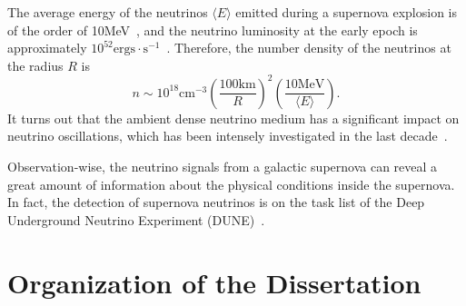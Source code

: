 The average energy of the neutrinos $\langle E \rangle$ emitted during a supernova explosion is of the order of 10MeV~\cite{Janka2017}, and the neutrino luminosity at the early epoch is approximately $10^{52}\mathrm{ergs\cdot s^{-1}}$~\cite{Pejcha2012a}.
Therefore, the number density of the neutrinos at the radius $R$ is
\begin{equation*}
   n \sim  10^{18} \mathrm{cm^{-3}} \left(\frac{100\mathrm{km}}{R}\right)^2 \left(\frac{10\mathrm{MeV}}{\langle E \rangle}\right).
\end{equation*}
It turns out that the ambient dense neutrino medium has a significant impact on neutrino oscillations, which has been intensely investigated in the last decade~\cite{Duan2010}.

Observation-wise, the neutrino signals from a galactic supernova can reveal a great amount of information about the physical conditions inside the supernova. In fact, the detection of supernova neutrinos is on the task list of the Deep Underground Neutrino Experiment (DUNE)~\cite{Kemp2017}.




\section{Organization of the Dissertation}


